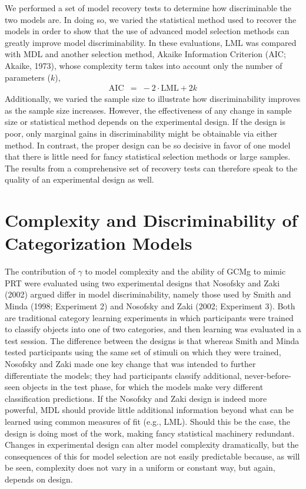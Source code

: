 \documentclass[11pt]{article}
\begin{document}
We performed a set of model recovery tests to determine how discriminable the two models
are. In doing so, we varied the statistical method used to recover the models in order to show
that the use of advanced model selection methods can greatly improve model discriminability. In
these evaluations, LML was compared with MDL and another selection method,  Akaike Information
Criterion (AIC; Akaike, 1973), whose complexity term takes into account only the number of
parameters ($k$),\footnotemark[5]
\begin{eqnarray}
\mbox{AIC} & = & -\ 2 \cdot \mbox{LML} + 2 k
\end{eqnarray}
Additionally, we varied the sample size to illustrate how discriminability improves as
the sample size increases. However, the effectiveness of any change in sample size or statistical
method depends on the experimental design. If the design is poor, only marginal gains in
discriminability might be obtainable via either method. In contrast, the proper design can be so
decisive in favor of one model that there is little need for fancy statistical selection methods
or large samples. The results from a comprehensive set of recovery tests can therefore speak to
the quality of an experimental design as well.


\section*{Complexity and Discriminability of Categorization Models}
The contribution of $\gamma$
to model complexity and the ability of GCMg to mimic PRT were evaluated using two experimental
designs that Nosofsky and Zaki (2002) argued differ in model discriminability, namely those used
by Smith and Minda (1998; Experiment 2) and Nosofsky and Zaki (2002; Experiment 3). Both are
traditional category learning experiments in which participants were trained to classify objects
into one of two categories, and then learning was evaluated in a test session. The difference
between the designs is that whereas Smith and Minda tested participants using the same set of
stimuli on which they were trained, Nosofsky and Zaki made one key change that was intended to
further differentiate the models; they had participants classify additional, never-before-seen
objects in the test phase, for which the models make very different classification predictions. If
the Nosofsky and Zaki design is indeed more powerful, MDL should provide little additional
information beyond what can be learned using common measures of fit (e.g., LML). Should this be
the case, the design is doing most of the work, making fancy statistical machinery redundant.
Changes in experimental design can alter model complexity dramatically, but the consequences of
this for model selection are not easily predictable because, as will be seen, complexity does not
vary in a uniform or constant way, but again, depends on design.
\end{document}
